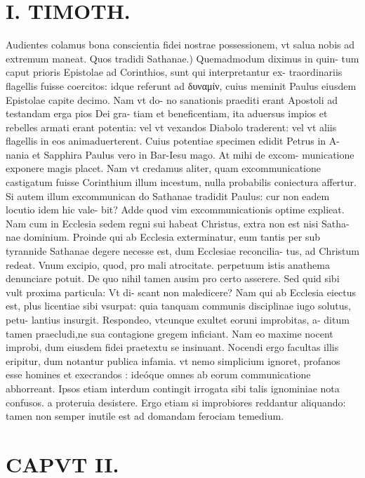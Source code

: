 \documentclass{article}
\begin{document}
\begin{pages}
\section*{I. TIMOTH. }
\marginpar{[ p.16 ]}\pstart Audientes colamus bona conscientia fidei nostrae possessionem, vt salua nobis ad extremum maneat.  \pend\pstart Quos tradidi Sathanae.) Quemadmodum diximus in quin- tum caput prioris Epistolae ad Corinthios, sunt qui interpretantur ex- traordinariis flagellis fuisse coercitos: idque referunt ad δυναμίν, cuius meminit Paulus eiusdem Epistolae capite decimo. Nam vt do- no sanationis praediti erant Apostoli ad testandam erga pios Dei gra- tiam et beneficentiam, ita aduersus impios et rebelles armati erant potentia: vel vt vexandos Diabolo traderent: vel vt aliis flagellis in eos animaduerterent. Cuius potentiae specimen edidit Petrus in A- nania et Sapphira Paulus vero in Bar-Iesu mago. At mihi de excom- municatione exponere magis placet. Nam vt credamus aliter, quam excommunicatione castigatum fuisse Corinthium illum incestum, nulla probabilis coniectura affertur. Si autem illum excommunican do Sathanae tradidit Paulus: cur non eadem locutio idem hic vale- bit? Adde quod vim excommunicationis optime explieat. Nam cum in Ecclesia sedem regni sui habeat Christus, extra non est nisi Satha- nae dominium. Proinde qui ab Ecclesia exterminatur, eum tantis per sub tyrannide Sathanae degere necesse est, dum Ecclesiae reconcilia- tus, ad Christum redeat. Vnum excipio, quod, pro mali atrocitate. perpetuum istis anathema denunciare potuit. De quo nihil tamen ausim pro certo asserere. Sed quid sibi vult proxima particula: Vt di- scant non maledicere? Nam qui ab Ecclesia eiectus est, plus licentiae sibi vsurpat: quia tanquam communis disciplinae iugo solutus, petu- lantius insurgit. Respondeo, vtcunque exultet eoruni improbitas, a- ditum tamen praecludi,ne sua contagione gregem inficiant. Nam eo maxime nocent improbi, dum eiusdem fidei praetextu se insinuant. Nocendi ergo facultas illis eripitur, dum notantur publica infamia. vt nemo simplicium ignoret, profanos esse homines et execrandos : ideóque omnes ab eorum communicatione abhorreant. Ipsos etiam interdum contingit irrogata sibi talis ignominiae nota confusos. a proteruia desistere. Ergo etiam si improbiores reddantur aliquando: tamen non semper inutile est ad domandam ferociam temedium.  \pend
\endnumbering\beginnumbering\section{CAPVT II.}
{}

\end{pages}
\end{document}
